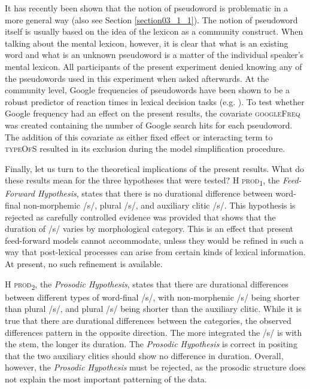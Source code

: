 It has recently been shown that the notion of pseudoword is problematic in a more general way (also see Section \ref{section03_1_1}). The notion of pseudoword itself is usually based on the idea of the lexicon as a community construct. When talking about the mental lexicon, however, it is clear that what is an existing word and what is an unknown pseudoword is a matter of the individual speaker’s mental lexicon. All participants of the present experiment denied knowing any of the pseudowords used in this experiment when asked afterwards. At the community level, Google frequencies of pseudowords have been shown to be a robust predictor of reaction times in lexical decision tasks (e.g. \cite{Hendrix2020}). To test whether Google frequency had an effect on the present results, the covariate \textsc{googleFreq} was created containing the number of Google search hits for each pseudoword. The addition of this covariate as either fixed effect or interacting term to \textsc{typeOfS} resulted in its exclusion during the model simplification procedure.

Finally, let us turn to the theoretical implications of the present results. What do these results mean for the three hypotheses that were tested? \textsc{H prod\textsubscript{1}}, the \textit{Feed-Forward Hypothesis}, states that there is no durational difference between word-final non-morphemic /s/, plural /s/, and auxiliary clitic /s/. This hypothesis is rejected as carefully controlled evidence was provided that shows that the duration of /s/ varies by morphological category. This is an effect that present feed-forward models cannot accommodate, unless they would be refined in such a way that post-lexical processes can arise from certain kinds of lexical information. At present, no such refinement is available. 

\textsc{H prod\textsubscript{2}}, the \textit{Prosodic Hypothesis}, states that there are durational differences between different types of word-final /s/, with non-morphemic /s/ being shorter than plural /s/, and plural /s/ being shorter than the auxiliary clitic. While it is true that there are durational differences between the categories, the observed differences pattern in the opposite direction. The more integrated the /s/ is with the stem, the longer its duration. The \textit{Prosodic Hypothesis} is correct in positing that the two auxiliary clitics should show no difference in duration. Overall, however, the \textit{Prosodic Hypothesis} must be rejected, as the prosodic structure does not explain the most important patterning of the data.

